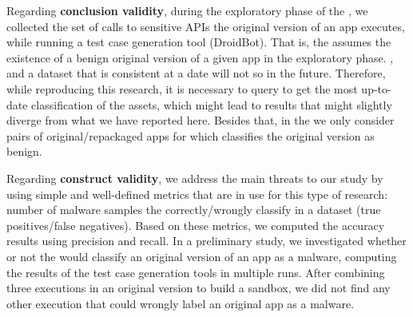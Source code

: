 Regarding {\bf conclusion validity}, during the exploratory phase of the \mas, we collected the set of calls to sensitive APIs the original version of
an app executes, while running a test case generation tool (DroidBot).
That is, the \mas assumes the existence of a benign original
version of a given app in the exploratory phase. , and a dataset that is consistent at a date will
not so in the future.
Therefore, while reproducing this research, it is necessary to query \vt to get the most up-to-date classification of the assets, which might lead to results that might slightly
diverge from what we have reported here. Besides that, in the \cds we only consider
pairs of original/repackaged apps for which \vt classifies the original version as benign. 

\begin{comment}    
Regarding the \textbf{correlation between dataset properties and accuracy drop}, after running statistical tests (logistic regression),
we could not find evidence that the \emph{diversity} of the
complete dataset---in terms of similarity score and types of malware-
is responsible for the higher number of false negatives of the mining
sandbox approach. This implies that there was no 1-1 correlation between the brackets of similarity index, malware types to the drops in accuracy. Therefore, further research is necessary to investigate
other possible reasons for that. Perhaps, the complete dataset
contains a large percentage of malware that use more
advanced techniques to evade from both static and dynamic analysis---
both methods are used in the mining sandbox approach
we discussed in this paper.
\end{comment}


Regarding {\bf construct validity}, we address the main threats to our study by using simple and
well-defined metrics that are in use for this type of research: number of malware samples the
\mas correctly/wrongly classify in a dataset (true positives/false negatives).
Based on these metrics, we computed the accuracy results using precision and recall. In a preliminary study, we
investigated whether or not the \mas would classify an original version of an app as a malware,
computing the results of the test case generation tools in multiple runs. After combining three executions
in an original version to build a sandbox, we did not find any other execution that could wrongly
label an original app as a malware. 
